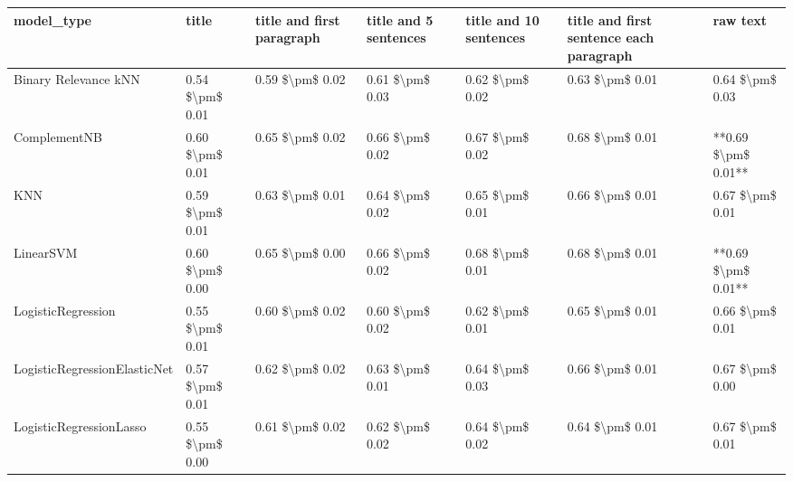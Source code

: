 \begin{tabular}{lllllll}
\toprule
                     model\_type &           title & title and first paragraph & title and 5 sentences & title and 10 sentences & title and first sentence each paragraph &            raw text \\
\midrule
           Binary Relevance kNN & 0.54 \$\textbackslash pm\$ 0.01 &           0.59 \$\textbackslash pm\$ 0.02 &       0.61 \$\textbackslash pm\$ 0.03 &        0.62 \$\textbackslash pm\$ 0.02 &                         0.63 \$\textbackslash pm\$ 0.01 &     0.64 \$\textbackslash pm\$ 0.03 \\
                   ComplementNB & 0.60 \$\textbackslash pm\$ 0.01 &           0.65 \$\textbackslash pm\$ 0.02 &       0.66 \$\textbackslash pm\$ 0.02 &        0.67 \$\textbackslash pm\$ 0.02 &                         0.68 \$\textbackslash pm\$ 0.01 & **0.69 \$\textbackslash pm\$ 0.01** \\
                            KNN & 0.59 \$\textbackslash pm\$ 0.01 &           0.63 \$\textbackslash pm\$ 0.01 &       0.64 \$\textbackslash pm\$ 0.02 &        0.65 \$\textbackslash pm\$ 0.01 &                         0.66 \$\textbackslash pm\$ 0.01 &     0.67 \$\textbackslash pm\$ 0.01 \\
                      LinearSVM & 0.60 \$\textbackslash pm\$ 0.00 &           0.65 \$\textbackslash pm\$ 0.00 &       0.66 \$\textbackslash pm\$ 0.02 &        0.68 \$\textbackslash pm\$ 0.01 &                         0.68 \$\textbackslash pm\$ 0.01 & **0.69 \$\textbackslash pm\$ 0.01** \\
             LogisticRegression & 0.55 \$\textbackslash pm\$ 0.01 &           0.60 \$\textbackslash pm\$ 0.02 &       0.60 \$\textbackslash pm\$ 0.02 &        0.62 \$\textbackslash pm\$ 0.01 &                         0.65 \$\textbackslash pm\$ 0.01 &     0.66 \$\textbackslash pm\$ 0.01 \\
   LogisticRegressionElasticNet & 0.57 \$\textbackslash pm\$ 0.01 &           0.62 \$\textbackslash pm\$ 0.02 &       0.63 \$\textbackslash pm\$ 0.01 &        0.64 \$\textbackslash pm\$ 0.03 &                         0.66 \$\textbackslash pm\$ 0.01 &     0.67 \$\textbackslash pm\$ 0.00 \\
        LogisticRegressionLasso & 0.55 \$\textbackslash pm\$ 0.00 &           0.61 \$\textbackslash pm\$ 0.02 &       0.62 \$\textbackslash pm\$ 0.02 &        0.64 \$\textbackslash pm\$ 0.02 &                         0.64 \$\textbackslash pm\$ 0.01 &     0.67 \$\textbackslash pm\$ 0.01 \\

\end{tabular}
